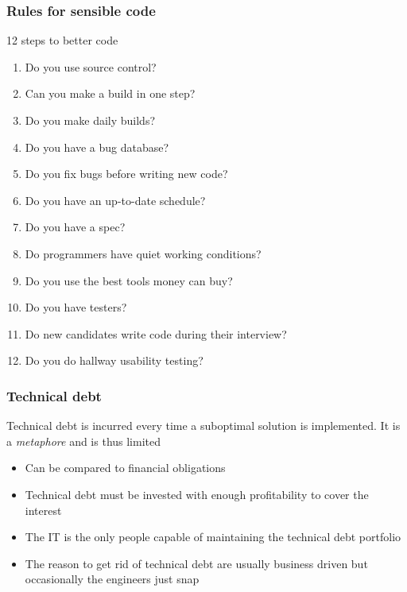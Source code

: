 \begin{frame}[fragile]
  \frametitle{Rules for sensible code}
  12 steps to better code \cite{spolsky2004joel}
\small  
	\begin{enumerate}
		\item Do you use source control?
		\item Can you make a build in one step?
		\item Do you make daily builds?
		\item Do you have a bug database?
		\item Do you fix bugs before writing new code?
		\item Do you have an up-to-date schedule?
		\item Do you have a spec?
		\item Do programmers have quiet working conditions?
		\item Do you use the best tools money can buy?
		\item Do you have testers?
		\item Do new candidates write code during their interview?
		\item Do you do hallway usability testing?
	\end{enumerate}
\normalsize
\end{frame}


\begin{frame}[fragile]
  \frametitle{Technical debt}
  Technical debt is incurred every time a suboptimal solution is implemented. It is a \emph{metaphore} and is thus limited
  \begin{itemize}
	\item Can be compared to financial obligations
	\item Technical debt must be invested with enough profitability to cover the interest
	\item The IT is the only people capable of maintaining the technical debt portfolio
	\item The reason to get rid of technical debt are usually business driven but occasionally the engineers just snap
  \end{itemize}
\end{frame}

